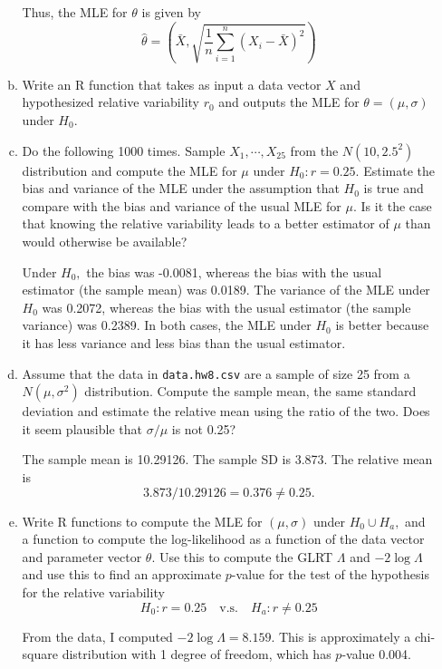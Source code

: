 \documentclass{article}
\begin{document}
\begin{itemize}
\begin{enumerate}[(a)]
\begin{soln}
					Thus, the MLE for $\theta$ is given by \[\hat\theta = \left( \bar{X}, \sqrt{\frac{1}{n} \sum_{i=1}^{n} (X_i-\bar{X})^2} \right)\]
				\end{soln}

			\item Write an R function that takes as input a data vector $X$ and hypothesized relative variability $r_0$ and outputs the MLE for $\theta=(\mu, \sigma)$ under $H_0.$

			\item Do the following 1000 times. Sample $X_1, \cdots, X_{25}$ from the $N(10, 2.5^2)$ distribution and compute the MLE for $\mu$ under $H_0: r=0.25.$ Estimate the bias and variance of the MLE under the assumption that $H_0$ is true and compare with the bias and variance of the usual MLE for $\mu.$ Is it the case that knowing the relative variability leads to a better estimator of $\mu$ than would otherwise be available?
				\begin{answer*}
					Under $H_0,$ the bias was -0.0081, whereas the bias with the usual estimator (the sample mean) was 0.0189. The variance of the MLE under $H_0$ was 0.2072, whereas the bias with the usual estimator (the sample variance) was 0.2389. In both cases, the MLE under $H_0$ is better because it has less variance and less bias than the usual estimator.
				\end{answer*}

			\item Assume that the data in \verb|data.hw8.csv| are a sample of size 25 from a $N(\mu, \sigma^2)$ distribution. Compute the sample mean, the same standard deviation and estimate the relative mean using the ratio of the two. Does it seem plausible that $\sigma/\mu$ is not 0.25?
				\begin{answer*}
					The sample mean is 10.29126. The sample SD is 3.873. The relative mean is \[3.873/10.29126=0.376\neq 0.25.\]
				\end{answer*}

			\item Write R functions to compute the MLE for $(\mu, \sigma)$ under $H_0\cup H_a,$ and a function to compute the log-likelihood as a function of the data vector and parameter vector $\theta.$ Use this to compute the GLRT $\Lambda$ and $-2\log \Lambda$ and use this to find an approximate $p$-value for the test of the hypothesis for the relative variability \[H_0:r=0.25\quad\text{v.s.}\quad H_a:r\neq 0.25\]
				\begin{answer*}
					From the data, I computed $-2\log \Lambda=8.159.$ This is approximately a chi-square distribution with 1 degree of freedom, which has $p$-value 0.004.
				\end{answer*}


\end{enumerate}
\end{itemize}
\end{document}
